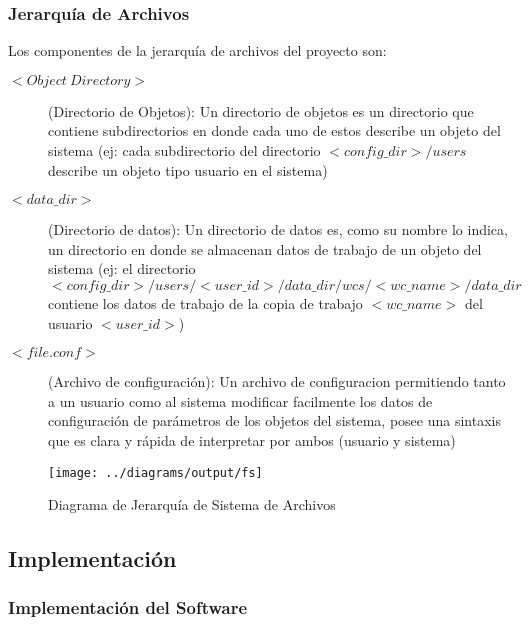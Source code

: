 \subsubsection{Jerarquía de Archivos}

Los componentes de la jerarquía de archivos del proyecto son:

\begin{description}
	
	\item[$<Object\ Directory>$] (Directorio de Objetos):\newline
	Un directorio de objetos es un directorio que contiene subdirectorios en donde cada uno de estos describe un objeto del sistema (ej: cada subdirectorio del directorio $<config\_dir>/users$ describe un objeto tipo usuario en el sistema)
	
	\item[$<data\_dir>$] (Directorio de datos):\newline
	Un directorio de datos es, como su nombre lo indica, un directorio en donde se almacenan datos de trabajo de un objeto del sistema (ej: el directorio $<config\_dir>/users/<user\_id>/data\_dir/wcs/<wc\_name>/data\_dir$ contiene los datos de trabajo de la copia de trabajo $<wc\_name>$ del usuario $<user\_id>$)
	
	\item[$<file.conf>$] (Archivo de configuración):\newline
	Un archivo de configuracion permitiendo tanto a un usuario como al sistema modificar facilmente los datos de configuración de parámetros de los objetos del sistema, posee una sintaxis que es clara y rápida de interpretar por ambos (usuario y sistema)
	
\end{description}

\begin{figure}
 \centering
 \texttt{[image: ../diagrams/output/fs]}
 \caption{Diagrama de Jerarquía de Sistema de Archivos}
 \label{diagrama:fs}
\end{figure}


\newpage

\subsection{Implementación}


\subsubsection{Implementación del Software}

